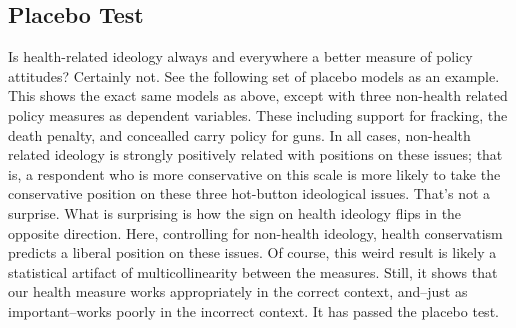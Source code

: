\documentclass[
  oneside]{book}
\begin{document}
\hypertarget{placebo-test}{%
\subsection{Placebo Test}\label{placebo-test}}

Is health-related ideology always and everywhere a better measure of policy attitudes? Certainly not. See the following set of placebo models as an example. This shows the exact same models as above, except with three non-health related policy measures as dependent variables. These including support for fracking, the death penalty, and concealled carry policy for guns. In all cases, non-health related ideology is strongly positively related with positions on these issues; that is, a respondent who is more conservative on this scale is more likely to take the conservative position on these three hot-button ideological issues. That's not a surprise. What is surprising is how the sign on health ideology flips in the opposite direction. Here, controlling for non-health ideology, health conservatism predicts a liberal position on these issues. Of course, this weird result is likely a statistical artifact of multicollinearity between the measures. Still, it shows that our health measure works appropriately in the correct context, and--just as important--works poorly in the incorrect context. It has passed the placebo test.
\end{document}
